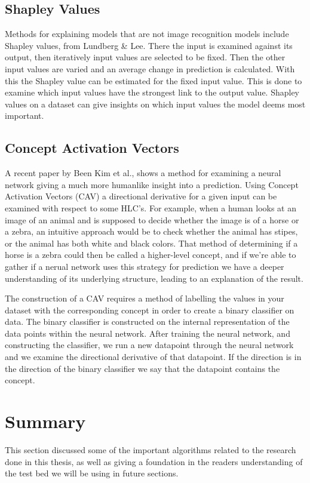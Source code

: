 \subsection{Shapley Values}

Methods for explaining models that are not image recognition models include
Shapley values, from Lundberg \& Lee\cite{LundbergL:shapley}. There the input is examined against its output, then iteratively
input values are selected to be fixed. Then the other input values are varied and
an average change in prediction is calculated. With this the Shapley value can be
estimated for the fixed input value. This is done to examine which input values have
the strongest link to the output value. Shapley values on a dataset can give insights
on which input values the model deems most important.

\subsection{Concept Activation Vectors}

A recent paper by Been Kim et al.\cite{Keem:TCAV}, shows a method for examining
a neural network giving a much more humanlike insight into a prediction. Using Concept
Activation Vectors (CAV) a directional derivative for a given input can be examined
with respect to some HLC's. For example, when a human looks at an image of an animal
and is supposed to decide whether the image is of a horse or a zebra, an intuitive
approach would be to check whether the animal has stipes, or the animal has both white and black colors.
That method of determining if a horse is a zebra could then be called a higher-level
concept, and if we're able to gather if a nerual network uses this strategy for prediction
we have a deeper understanding of its underlying structure, leading to an explanation of
the result.

The construction of a CAV requires a method of labelling the values in your dataset with
the corresponding concept in order to create a binary classifier on data. The binary classifier is constructed on the internal representation of the data points within the neural network. After training the neural network, and constructing the classifier, we run a new datapoint through the neural network and we examine the directional derivative of that datapoint. If the direction is in the direction of the binary classifier we say that the datapoint contains the concept.

\section{Summary}

This section discussed some of the important algorithms related to the research done in this thesis, as well as giving a foundation in the readers understanding of the test bed we will be using in future sections.